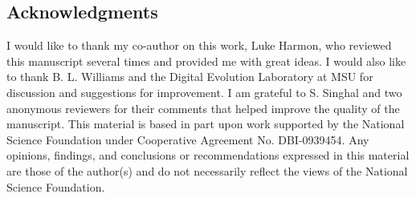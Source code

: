 \begin{doublespace}
\section*{Acknowledgments}

I would like to thank my co-author on this work, Luke Harmon,
who reviewed this manuscript several times and provided me with great ideas.
%
I would also like to thank B. L. Williams
and the Digital Evolution Laboratory at MSU
for discussion and suggestions for improvement.
%
I am grateful to S. Singhal and two anonymous reviewers for their comments
that helped improve the quality of the manuscript.
%
This material is based in part upon work supported by
the National Science Foundation under Cooperative Agreement No. DBI-0939454.
%
Any opinions, findings, and conclusions or recommendations
expressed in this material are those of the author(s)
and do not necessarily reflect the views of the National Science Foundation.


\end{doublespace}



